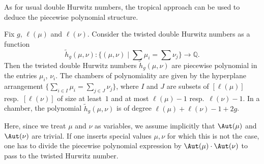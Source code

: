 As for usual double Hurwitz numbers, the tropical approach can be used to deduce the piecewise polynomial structure.

\begin{theo}\label{thm-PP}
Fix $g$, $\ell(\mu)$ and $\ell(\nu)$. Consider the twisted double Hurwitz numbers as a function 
$$\tilde{h}_g(\mu,\nu):\Big\{(\mu,\nu) \mid \sum \mu_i=\sum\nu_j\Big\} \longrightarrow\mathbb{Q}.$$ 
Then the twisted double Hurwitz numbers $\tilde{h}_g(\mu,\nu)$ are piecewise polynomial in the entries $\mu_i$, $\nu_i$. 
The chambers of polynomiality are given by the hyperplane arrangement $\{\sum_{i\in I}\mu_i=\sum_{j\in J}\nu_j\}$, where $I$ and $J$ are subsets of $[\ell(\mu)]$ resp.\ $[\ell(\nu)]$ of size at least~$1$ and at most $\ell(\mu)-1$ resp.\ $\ell(\nu)-1$.
In a chamber, the polynomial $\tilde{h}_g(\mu,\nu)$ is of degree $\ell(\mu)+\ell(\nu)-1+2g$. 
\end{theo}

Here, since we treat $\mu$ and $\nu$ as variables, we assume implicitly that $\Aut(\mu)$ and $\Aut(\nu)$ are trivial. If one inserts special values $\mu,\nu$ for which this is not the case, one has to divide the piecewise polynomial expression by $\Aut(\mu)\cdot \Aut(\nu)$ to pass to the twisted Hurwitz number.

